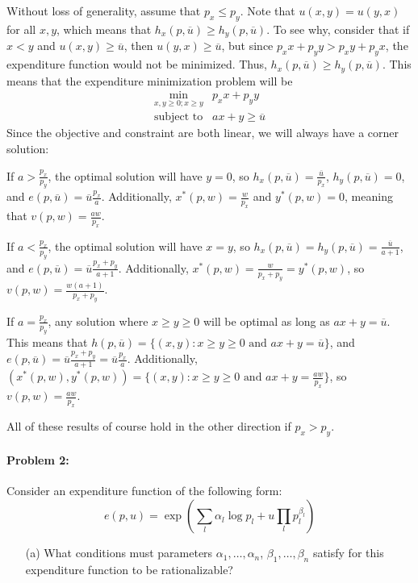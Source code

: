 \documentclass[12pt]{article}
\begin{document}
\begin{itemize}
    
    
    Without loss of generality, assume that $p_x \le p_y$. Note that $u(x,y) = u(y,x)$ for all $x,y$, which means that $h_x(p,\overline{u}) \ge h_y(p,\overline{u})$. To see why, consider that if $x < y$ and $u(x,y) \ge \overline{u}$, then $u(y,x) \ge \overline{u}$, but since $p_xx+p_yy > p_xy + p_yx$, the expenditure function would not be minimized. Thus, $h_x(p,\overline{u}) \ge h_y(p,\overline{u})$. This means that the expenditure minimization problem will be
    \[
    \begin{array}{ll}
        \min_{x,y \ge 0 ; x \ge y} & p_xx + p_yy \\
        \text{subject to} & ax + y \ge \overline{u}
    \end{array}
    \]
    Since the objective and constraint are both linear, we will always have a corner solution:

    If $a > \frac{p_x}{p_y}$, the optimal solution will have $y = 0$, so $h_x(p,\overline{u}) = \frac{\overline{u}}{p_x}$, $h_y(p,\overline{u}) = 0$, and $e(p,\overline{u}) = \overline{u}\frac{p_x}{a}$. Additionally, $x^*(p,w) = \frac{w}{p_x}$ and $y^*(p,w) = 0$, meaning that $v(p,w) = \frac{aw}{p_x}$.

    If $a < \frac{p_x}{p_y}$, the optimal solution will have $x = y$, so $h_x(p,\overline{u}) = h_y(p,\overline{u}) = \frac{\overline{u}}{a+1}$, and $e(p,\overline{u}) = \overline{u}\frac{p_x + p_y}{a+1}$. Additionally, $x^*(p,w) = \frac{w}{p_x + p_y} = y^*(p,w)$, so $v(p,w) = \frac{w(a+1)}{p_x + p_y}$.

    If $a = \frac{p_x}{p_y}$, any solution where $x \ge y \ge 0$ will be optimal as long as $ax + y = \overline{u}$. This means that $h(p,\overline{u}) = \{(x,y) : x \ge y \ge 0 \text{ and } ax + y = \overline{u}\}$, and $e(p,\overline{u}) = \overline{u}\frac{p_x + p_y}{a+1} = \overline{u}\frac{p_x}{a}$. Additionally, $(x^*(p,w),y^*(p,w)) = \{(x,y) : x \ge y \ge 0 \text{ and } ax + y = \frac{aw}{p_x}\}$, so $v(p,w) = \frac{aw}{p_x}$.

    All of these results of course hold in the other direction if $p_x > p_y$.
    
\end{itemize}

\paragraph{Problem 2:} Consider an expenditure function of the following form:
\[
e(p,u) = \exp\left(\sum_l \alpha_l \log p_l + u\prod_l p_l^{\beta_l}  \right)
\]
\begin{itemize}
    \item[(a)] What conditions must parameters $\alpha_1,\dots,\alpha_n$, $\beta_1,\dots,\beta_n$ satisfy for this expenditure function to be rationalizable?
\end{itemize}
\end{document}
